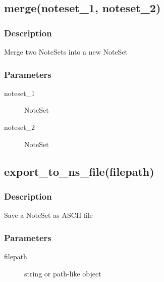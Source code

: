 \subsection{merge(noteset\_1, noteset\_2)}
\subsubsection{Description}
Merge two NoteSets into a new NoteSet
\subsubsection{Parameters}
\begin{description}
\item [noteset\_1] NoteSet
\item [noteset\_2] NoteSet
\end{description} 

\subsection{export\_to\_ns\_file(filepath)}
\subsubsection{Description}
Save a NoteSet as ASCII file
\subsubsection{Parameters}
\begin{description}
\item [filepath] string or path-like object
\end{description}